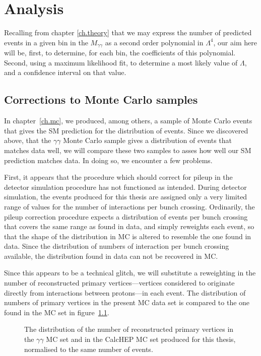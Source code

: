 \chapter{Analysis}\label{ch.an}

Recalling from chapter \ref{ch.theory} that we may express the number of predicted events in a given bin in the $M_{\gamma\gamma}$ as a second order polynomial in $\Lambda^4$, our aim here will be, first, to determine, for each bin, the coefficients of this polynomial. Second, using a maximum likelihood fit, to determine a most likely value of $\Lambda$, and a confidence interval on that value.

\section{Corrections to Monte Carlo samples}

In chapter~\ref{ch.mc}, we produced, among others, a sample of Monte Carlo events that gives the SM prediction for the distribution of events. Since we discovered above, that the \atlas{} $\gamma\gamma$ Monte Carlo sample gives a distribution of events that matches data well, we will compare these two samples to asses how well our SM prediction matches data. In doing so, we encounter a few problems.

First, it appears that the procedure which should correct for pileup in the detector simulation procedure has not functioned as intended. During detector simulation, the events produced for this thesis are assigned only a very limited range of values for the number of interactions per bunch crossing. Ordinarily, the pileup correction procedure expects a distribution of events per bunch crossing that covers the same range as found in data, and simply reweights each event, so that the shape of the distribution in MC is altered to resemble the one found in data. Since the distribution of numbers of interaction per bunch crossing available, the distribution found in data can not be recovered in MC.

Since this appears to be a technical glitch, we will substitute a reweighting in the number of reconstructed primary vertices---vertices considered to originate directly from interactions between protons---in each event. The distribution of numbers of primary vertices in the present MC data set is compared to the one found in the \atlas{} MC set in figure~\ref{pvnnone}.

\begin{figure}[htp]
\begin{minipage}[b]{.69\textwidth}
\begin{infilsf} \tiny

\end{infilsf}
\end{minipage}
\begin{minipage}[b]{.3\textwidth}
\caption{The distribution of the number of reconstructed primary vertices in the \atlas{} $\gamma\gamma$ MC set and in the CalcHEP MC set produced for this thesis, normalised to the same number of events.}\label{pvnnone}
\end{minipage}
\end{figure}


